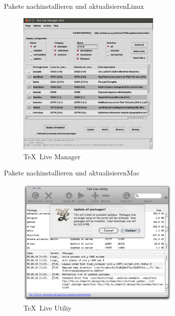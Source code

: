 \begin{Frame}{Pakete nachinstallieren und aktualisieren}{Linux}
  \begin{figure}
    \centering
    \includegraphics[width=7cm]{images/texlive-update}
    \caption{\TeX\ Live Manager}
  \end{figure}
\end{Frame}

\begin{Frame}{Pakete nachinstallieren und aktualisieren}{Mac}
  \begin{figure}
    \centering
    \includegraphics[width=8cm]{images/mactex-update}
    \caption{\TeX\ Live Utiliy}
  \end{figure}
\end{Frame}


